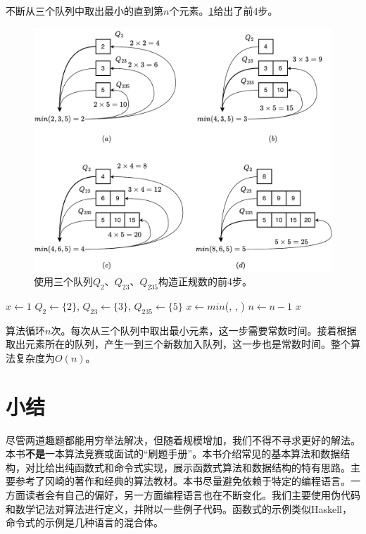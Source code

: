 \documentclass[b5paper]{ctexart}
\begin{document}
不断从三个队列中取出最小的直到第$n$个元素。\cref{fig:q235}给出了前4步。

\begin{figure}[htbp]
  \centering
  \includegraphics[scale=0.5]{img/q235}
  \caption{使用三个队列$Q_2$、$Q_{23}$、$Q_{235}$构造正规数的前4步。}
  \label{fig:q235}
\end{figure}

\begin{algorithmic}[1]
  \State $x \gets 1$
  \State $Q_2 \gets \{ 2 \}$, $Q_{23} \gets \{ 3 \}$, $Q_{235} \gets \{ 5 \}$
    \State $x \gets min$(, , )
      \State {}
      \State {}
      \State {}
      \State {}
      \State {}
      \State {}
      \State {}
    \Else
      \State {}
      \State {}
    \EndIf
    \State $n \gets n - 1$
  \EndWhile
  \State \Return $x$
\EndFunction
\end{algorithmic}

算法循环$n$次。每次从三个队列中取出最小元素，这一步需要常数时间。接着根据取出元素所在的队列，产生一到三个新数加入队列，这一步也是常数时间。整个算法复杂度为$O(n)$。

\section*{小结}
尽管两道趣题都能用穷举法解决，但随着规模增加，我们不得不寻求更好的解法。本书\textbf{不是}一本算法竞赛或面试的“刷题手册”。本书介绍常见的基本算法和数据结构，对比给出纯函数式和命令式实现，展示函数式算法和数据结构的特有思路。主要参考了冈崎的著作\cite{okasaki-book}和经典的算法教材\cite{CLRS}。本书尽量避免依赖于特定的编程语言。一方面读者会有自己的偏好，另一方面编程语言也在不断变化。我们主要使用伪代码和数学记法对算法进行定义，并附以一些例子代码。函数式的示例类似Haskell，命令式的示例是几种语言的混合体。
\end{document}

